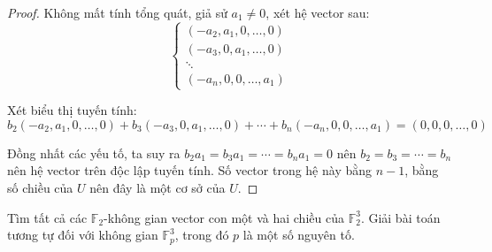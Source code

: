 \documentclass[class=linear-algebra,crop=false]{standalone}
\begin{document}
\begin{proof}
    \par Không mất tính tổng quát, giả sử $a_{1}\ne 0$, xét hệ vector sau:
    \[
        \begin{cases}
            (-a_{2}, a_{1}, 0, \ldots, 0) \\
            (-a_{3}, 0, a_{1}, \ldots, 0) \\
            \ddots                        \\
            (-a_{n}, 0, 0, \ldots, a_{1})
        \end{cases}
    \]
    \par Xét biểu thị tuyến tính:
    \[ b_{2}(-a_{2}, a_{1}, 0, \ldots, 0) + b_{3}(-a_{3}, 0, a_{1}, \ldots, 0) + \cdots + b_{n}(-a_{n}, 0, 0, \ldots, a_{1}) = (0,0,0,\ldots, 0) \]
    \par Đồng nhất các yếu tố, ta suy ra $b_{2}a_{1} = b_{3}a_{1} = \cdots = b_{n}a_{1} = 0$ nên $b_{2} = b_{3} = \cdots = b_{n}$ nên hệ vector trên độc lập tuyến tính. Số vector trong hệ này bằng $n - 1$, bằng số chiều của $U$ nên đây là một cơ sở của $U$.
\end{proof}

\begin{exercise}Tìm tất cả các $\mathbb{F}_{2}$-không gian vector con một và hai chiều của $\mathbb{F}^{3}_{2}$. Giải bài toán tương tự đối với không gian $\mathbb{F}^{3}_{p}$, trong đó $p$ là một số nguyên tố.
\end{exercise}
\end{document}
